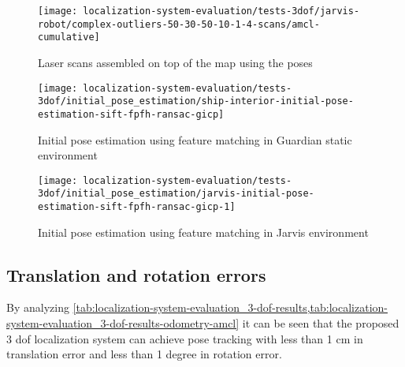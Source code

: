 \begin{figure}[H]
	\centering
	\texttt{[image: localization-system-evaluation/tests-3dof/jarvis-robot/complex-outliers-50-30-50-10-1-4-scans/amcl-cumulative]}
	\caption{Laser scans assembled on top of the map using the  poses}
	\label{fig:localization-system-evaluation_complex-path-with-outliers-50-30-50-10cm-per-sec-velocity-1-4-scans-amcl-cumulative}
\end{figure}


\begin{figure}[H]
	\centering
	\texttt{[image: localization-system-evaluation/tests-3dof/initial\_pose\_estimation/ship-interior-initial-pose-estimation-sift-fpfh-ransac-gicp]}
	\caption{Initial pose estimation using feature matching in Guardian static environment}
	\label{fig:localization-system-evaluation_ship-interior-initial-pose-estimation-sift-fpfh-ransac-gicp}
\end{figure}

\begin{figure}[H]
	\centering
	\texttt{[image: localization-system-evaluation/tests-3dof/initial\_pose\_estimation/jarvis-initial-pose-estimation-sift-fpfh-ransac-gicp-1]}
	\caption{Initial pose estimation using feature matching in Jarvis environment}
	\label{fig:localization-system-evaluation_jarvis-initial-pose-estimation-sift-fpfh-ransac-gicp-1}
\end{figure}





\subsection{Translation and rotation errors}

By analyzing \cref{tab:localization-system-evaluation_3-dof-results,tab:localization-system-evaluation_3-dof-results-odometry-amcl} it can be seen that the proposed 3 \gls{dof} localization system can achieve pose tracking with less than 1 cm in translation error and less than 1 degree in rotation error.

